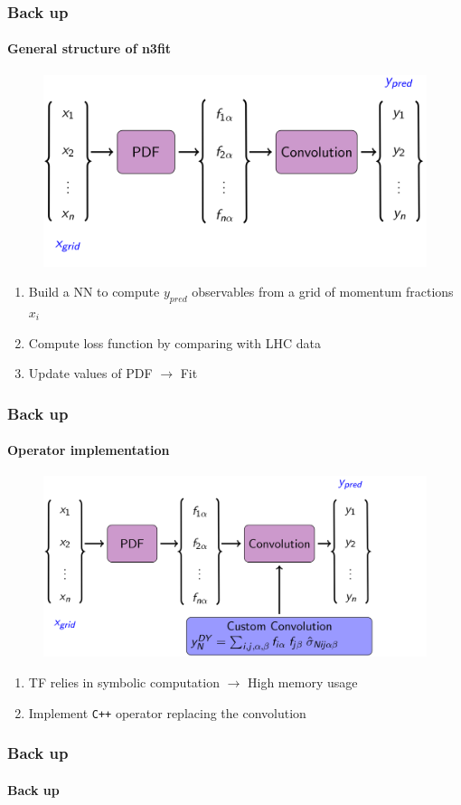 \documentclass[aspectratio=43]{beamer}
\begin{document}
\begin{frame}
	
	\frametitle{Back up}
	\framesubtitle{General structure of n3fit}
	
	\footnotesize
	
	\begin{figure}
		\includegraphics[width = 9 cm]{plots/backup/n3fit1.png}
	\end{figure}	

	\begin{enumerate}
		\item Build a NN to compute $y_{pred}$ observables from a grid of momentum fractions $x_{i}$
		\item Compute loss function by comparing with LHC data
		\item Update values of PDF $\longrightarrow$ {\color{violet} Fit}
	\end{enumerate}

\end{frame}

\begin{frame}

	\frametitle{Back up}
	\framesubtitle{Operator implementation}

	\footnotesize
	
	\begin{figure}
		\includegraphics[width = 10.5 cm]{plots/backup/n3fit2.png}
	\end{figure}

	\begin{enumerate}
		\item TF relies in symbolic computation $\longrightarrow$ High memory usage
		\item Implement \texttt{C++} operator replacing the convolution
	\end{enumerate}

\end{frame}

\begin{frame}
	
	\frametitle{Back up}
	\framesubtitle{Back up}

\end{frame}
\end{document}
